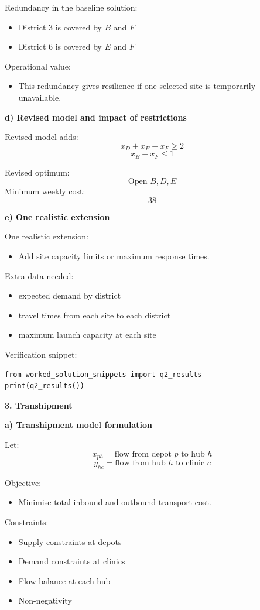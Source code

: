 \documentclass[11pt,a4paper]{article}
\begin{document}
Redundancy in the baseline solution:
\begin{itemize}
\item District 3 is covered by $B$ and $F$
\item District 6 is covered by $E$ and $F$
\end{itemize}

Operational value:
\begin{itemize}
\item This redundancy gives resilience if one selected site is temporarily unavailable.
\end{itemize}

\textbf{d) Revised model and impact of restrictions}

Revised model adds:
\[
x_D + x_E + x_F \ge 2
\]
\[
x_B + x_F \le 1
\]

Revised optimum:
\[
\text{Open } B, D, E
\]
Minimum weekly cost:
\[
38
\]

\textbf{e) One realistic extension}

One realistic extension:
\begin{itemize}
\item Add site capacity limits or maximum response times.
\end{itemize}

Extra data needed:
\begin{itemize}
\item expected demand by district
\item travel times from each site to each district
\item maximum launch capacity at each site
\end{itemize}

Verification snippet:
\begin{verbatim}
from worked_solution_snippets import q2_results
print(q2_results())
\end{verbatim}

\textbf{3. Transhipment}

\textbf{a) Transhipment model formulation}

Let:
\[
x_{ph} = \text{flow from depot } p \text{ to hub } h
\]
\[
y_{hc} = \text{flow from hub } h \text{ to clinic } c
\]

Objective:
\begin{itemize}
\item Minimise total inbound and outbound transport cost.
\end{itemize}

Constraints:
\begin{itemize}
\item Supply constraints at depots
\item Demand constraints at clinics
\item Flow balance at each hub
\item Non-negativity
\end{itemize}
\end{document}
